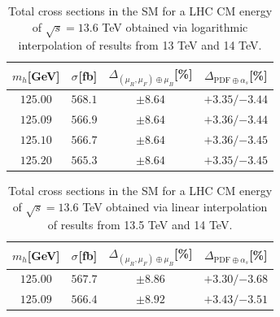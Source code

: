 \documentclass[11pt,a4paper]{article}
\begin{document}
\begin{table}[ht!]
\begin{center}%
\begin{small}%
\begin{tabular}{cccc}%
$m_h$[GeV] & $\sigma^{}$[fb] & $\Delta_{\left(\mu_{R},\mu_{F}\right)\oplus\mu_{B}}$[\%] & $\Delta_{\mathrm{PDF}\oplus\alpha_s}$[\%]  \\\hline
$125.00$ & $568.1$ & $\pm8.64$ & ${{+3.35}}/{-3.44}$ \\
$125.09$ & $566.9$ & $\pm8.64$ & ${{+3.36}}/{-3.44}$ \\
$125.10$ & $566.7$ & $\pm8.64$ & ${{+3.36}}/{-3.45}$ \\
$125.20$ & $565.3$ & $\pm8.64$ & ${{+3.35}}/{-3.45}$ 
\end{tabular}%
\end{small}%
\end{center}%
\caption{Total \bbH{} cross sections in the SM for a LHC CM energy of $\sqrt{s}=13.6$ TeV obtained via logarithmic interpolation of results from 13 TeV and 14 TeV.}
\label{tab:bbH136log}
\end{table}

\begin{table}[ht!]
\begin{center}%
\begin{small}%
\begin{tabular}{cccc}%
$m_h$[GeV] & $\sigma^{}$[fb] & $\Delta_{\left(\mu_{R},\mu_{F}\right)\oplus\mu_{B}}$[\%] & $\Delta_{\mathrm{PDF}\oplus\alpha_s}$[\%]  \\\hline
$125.00$ & $567.7$ & $\pm8.86$ & ${{+3.30}}/{-3.68}$ \\
$125.09$ & $566.4$ & $\pm8.92$ & ${{+3.43}}/{-3.51}$ 
\end{tabular}%
\end{small}%
\end{center}%
\caption{Total \bbH{} cross sections in the SM for a LHC CM energy of $\sqrt{s}=13.6$ TeV obtained via linear interpolation of results from 13.5 TeV and 14 TeV.}
\label{tab:bbH136linalt}
\end{table}
\end{document}

